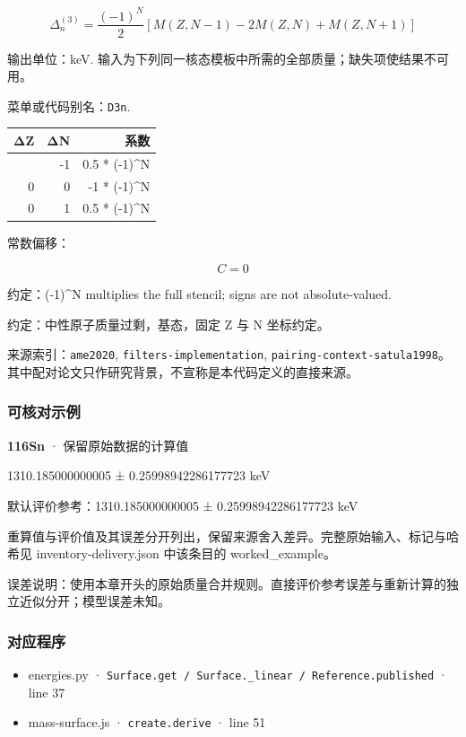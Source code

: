 \documentclass[
  11pt,
  letterpaper,
]{article}
\providecommand{\tightlist}{%
  \setlength{\itemsep}{0pt}\setlength{\parskip}{0pt}}
\begin{document}
\[
\Delta_n^{(3)}=\frac{(-1)^N}{2}[M(Z,N-1)-2M(Z,N)+M(Z,N+1)]
\]

输出单位：keV.
输入为下列同一核态模板中所需的全部质量；缺失项使结果不可用。

菜单或代码别名：\texttt{D3n}.

\begin{longtable}[]{@{}rrr@{}}
\toprule\noalign{}
ΔZ & ΔN & 系数 \\
\midrule\noalign{}
\endhead
\bottomrule\noalign{}
\endlastfoot
0 & -1 & 0.5 * (-1)\^{}N \\
0 & 0 & -1 * (-1)\^{}N \\
0 & 1 & 0.5 * (-1)\^{}N \\
\end{longtable}

常数偏移：

\[
C=0
\]

约定：(-1)\^{}N multiplies the full stencil; signs are not
absolute-valued.

约定：中性原子质量过剩，基态，固定 Z 与 N 坐标约定。

来源索引：\texttt{ame2020}, \texttt{filters-implementation},
\texttt{pairing-context-satula1998}。其中配对论文只作研究背景，不宣称是本代码定义的直接来源。

\subsubsection{可核对示例}\label{ux53efux6838ux5bf9ux793aux4f8b-22}

\textbf{116Sn} · 保留原始数据的计算值

1310.185000000005 ± 0.25998942286177723 keV

默认评价参考：1310.185000000005 ± 0.25998942286177723 keV

重算值与评价值及其误差分开列出，保留来源舍入差异。完整原始输入、标记与哈希见
inventory-delivery.json 中该条目的 worked\_example。

误差说明：使用本章开头的原始质量合并规则。直接评价参考误差与重新计算的独立近似分开；模型误差未知。

\subsubsection{对应程序}\label{ux5bf9ux5e94ux7a0bux5e8f-22}

\begin{itemize}
\tightlist
\item
  energies.py ·
  \texttt{Surface.get\ /\ Surface.\_linear\ /\ Reference.published} ·
  line 37
\item
  mass-surface.js · \texttt{create.derive} · line 51
\end{itemize}
\end{document}
